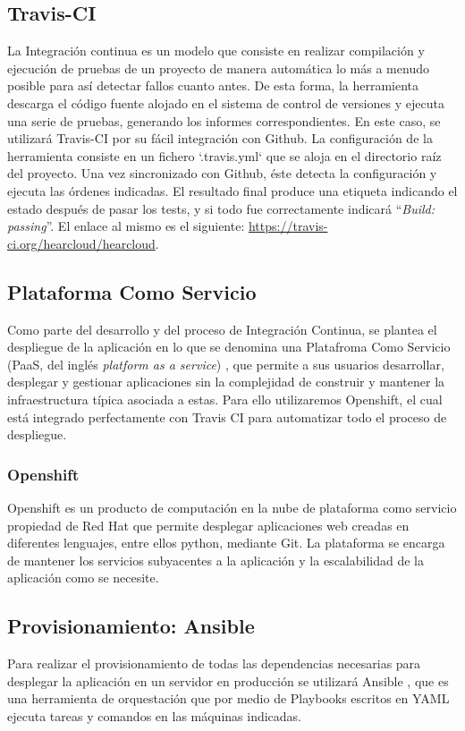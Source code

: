 \subsection{Travis-CI}
La Integración continua es un modelo que consiste en realizar compilación y ejecución de pruebas de un proyecto de manera automática lo más a menudo posible para así detectar fallos cuanto antes. De esta forma, la herramienta descarga el código fuente alojado en el sistema de control de versiones y ejecuta una serie de pruebas, generando los informes correspondientes. En este caso, se utilizará Travis-CI \cite{TravisCI} por su fácil integración con Github. La configuración de la herramienta consiste en un fichero `.travis.yml` que se aloja en el directorio raíz del proyecto. Una vez sincronizado con Github, éste detecta la configuración y ejecuta las órdenes indicadas. El resultado final produce una etiqueta indicando el estado después de pasar los tests, y si todo fue correctamente indicará ``\textit{Build: passing}''. El enlace al mismo es el siguiente: \url{https://travis-ci.org/hearcloud/hearcloud}.

\subsection{Plataforma Como Servicio}
Como parte del desarrollo y del proceso de Integración Continua, se plantea el despliegue de la aplicación en lo que se denomina una Platafroma Como Servicio (PaaS, del inglés \textit{platform as a service}) \cite{PaaS}, que permite a sus usuarios desarrollar, desplegar y gestionar aplicaciones sin la complejidad de construir y mantener la infraestructura típica asociada a estas. Para ello utilizaremos Openshift, el cual está integrado perfectamente con Travis CI para automatizar todo el proceso de despliegue. 

\subsubsection{Openshift}
Openshift \cite{Openshift} es un producto de computación en la nube de plataforma como servicio propiedad de Red Hat que permite desplegar aplicaciones web creadas en diferentes lenguajes, entre ellos python, mediante Git. La plataforma se encarga de mantener los servicios subyacentes a la aplicación y la escalabilidad de la aplicación como se necesite. 

\subsection{Provisionamiento: Ansible}
Para realizar el provisionamiento de todas las dependencias necesarias para desplegar la aplicación en un servidor en producción se utilizará Ansible \cite{Ansible}, que es una herramienta de orquestación que por medio de Playbooks escritos en YAML \cite{YAML} ejecuta tareas y comandos en las máquinas indicadas.

